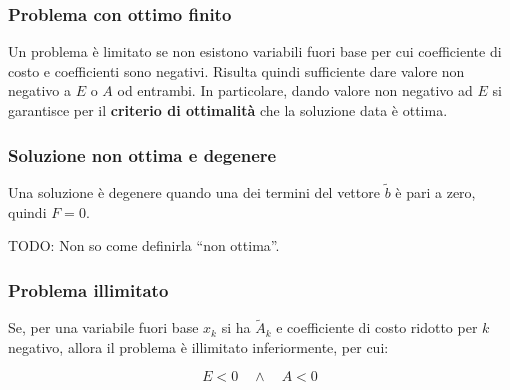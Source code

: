 \documentclass[\main/main.tex]{subfiles}
\begin{document}
\subsubsection*{Problema con ottimo finito}
Un problema è limitato se non esistono variabili fuori base per cui coefficiente di costo e coefficienti sono negativi. Risulta quindi sufficiente dare valore non negativo a $E$ o $A$ od entrambi. In particolare, dando valore non negativo ad $E$ si garantisce per il \textbf{criterio di ottimalità} che la soluzione data è ottima.

\subsubsection*{Soluzione non ottima e degenere}
Una soluzione è degenere quando una dei termini del vettore $\tilde{b}$ è pari a zero, quindi $F = 0$.

TODO: Non so come definirla ``non ottima''.

\subsubsection*{Problema illimitato}
Se, per una variabile fuori base $x_k$ si ha $\tilde{A}_k$ e coefficiente di costo ridotto per $k$ negativo, allora il problema è illimitato inferiormente, per cui:

\[
  E < 0 \quad \land \quad A < 0
\]
\end{document}
